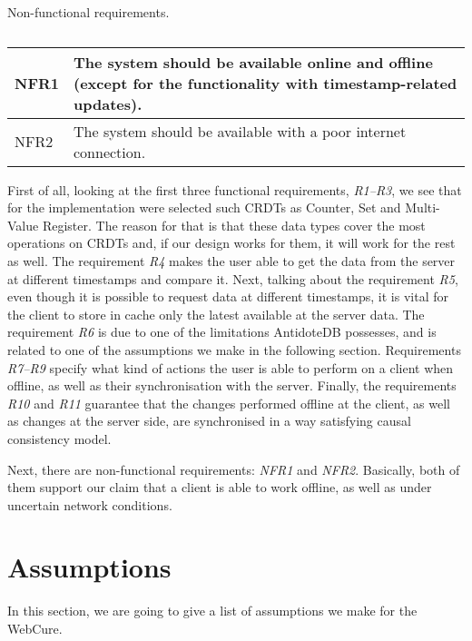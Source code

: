 \begin{table}[!htbp]
\centering
\caption{Non-functional requirements.}
\label{table:req2}
\begin{tabular}{|p{1cm}|p{14cm}|}
\hline
NFR1 & The system should be available online and offline (except for the functionality with timestamp-related updates). \\ \hline
NFR2 & The system should be available with a poor internet connection. \\ \hline
\end{tabular}
\caption*{}
\end{table} 

First of all, looking at the first three functional requirements, \textit{R1--R3}, we see that for the implementation were selected such CRDTs as Counter, Set and Multi-Value Register. The reason for that is that these data types cover the most operations on CRDTs and, if our design works for them, it will work for the rest as well. The requirement \textit{R4} makes the user able to get the data from the server at different timestamps and compare it. Next, talking about the requirement \textit{R5}, even though it is possible to request data at different timestamps, it is vital for the client to store in cache only the latest available at the server data. The requirement \textit{R6} is due to one of the limitations AntidoteDB possesses, and is related to one of the assumptions we make in the following section. Requirements \textit{R7--R9} specify what kind of actions the user is able to perform on a client when offline, as well as their synchronisation with the server. Finally, the requirements \textit{R10} and \textit{R11} guarantee that the changes performed offline at the client, as well as changes at the server side, are synchronised in a way satisfying causal consistency model. 

Next, there are non-functional requirements: \textit{NFR1} and \textit{NFR2}. Basically, both of them support our claim that a client is able to work offline, as well as under uncertain network conditions. 

\section{Assumptions}
\label{4-Assumptions}

In this section, we are going to give a list of assumptions we make for the WebCure. 


